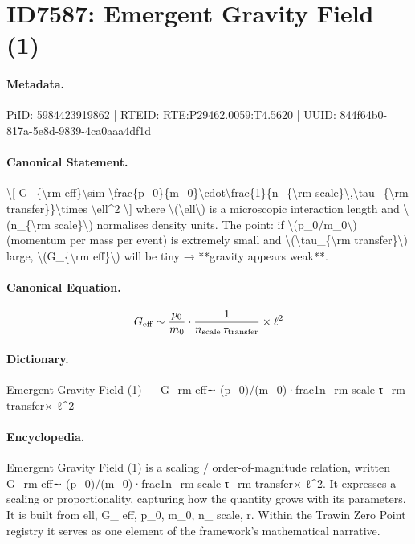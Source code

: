 \section*{ID7587: Emergent Gravity Field (1)}
\paragraph{Metadata.}
PiID: 5984423919862 | RTEID: RTE:P29462.0059:T4.5620 | UUID: 844f64b0-817a-5e8d-9839-4ca0aaa4df1d

\paragraph{Canonical Statement.}
\textbackslash{}[ G\_\{\textbackslash{}rm eff\}\textbackslash{}sim \textbackslash{}frac\{p\_0\}\{m\_0\}\textbackslash{}cdot\textbackslash{}frac\{1\}\{n\_\{\textbackslash{}rm scale\}\textbackslash{},\textbackslash{}tau\_\{\textbackslash{}rm transfer\}\}\textbackslash{}times \textbackslash{}ell\textasciicircum{}2 \textbackslash{}] where \textbackslash{}(\textbackslash{}ell\textbackslash{}) is a microscopic interaction length and \textbackslash{}(n\_\{\textbackslash{}rm scale\}\textbackslash{}) normalises density units. The point: if \textbackslash{}(p\_0/m\_0\textbackslash{}) (momentum per mass per event) is extremely small and \textbackslash{}(\textbackslash{}tau\_\{\textbackslash{}rm transfer\}\textbackslash{}) large, \textbackslash{}(G\_\{\textbackslash{}rm eff\}\textbackslash{}) will be tiny → **gravity appears weak**.

\paragraph{Canonical Equation.}
\[
G_{\rm eff}\sim \frac{p_0}{m_0}\cdot\frac{1}{n_{\rm scale}\,\tau_{\rm transfer}}\times \ell^2
\]

\paragraph{Dictionary.}
Emergent Gravity Field (1) — G\_rm eff∼ (p\_0)/(m\_0)·frac1n\_rm scale τ\_rm transfer× ℓ\textasciicircum{}2

\paragraph{Encyclopedia.}
Emergent Gravity Field (1) is a scaling / order-of-magnitude relation, written G\_rm eff∼ (p\_0)/(m\_0)·frac1n\_rm scale τ\_rm transfer× ℓ\textasciicircum{}2. It expresses a scaling or proportionality, capturing how the quantity grows with its parameters. It is built from ell, G\_ eff, p\_0, m\_0, n\_ scale, r. Within the Trawin Zero Point registry it serves as one element of the framework's mathematical narrative.
